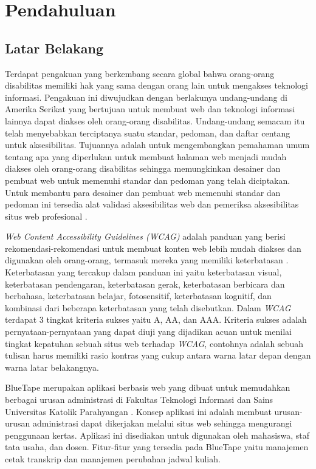 \chapter{Pendahuluan}
\label{chap:pendahuluan}
   
\section{Latar Belakang}
\label{sec:latarbelakang}
Terdapat pengakuan yang berkembang secara global bahwa orang-orang disabilitas memiliki hak yang sama dengan orang lain untuk mengakses teknologi informasi. Pengakuan ini diwujudkan dengan berlakunya undang-undang di Amerika Serikat yang bertujuan untuk membuat web dan teknologi informasi lainnya dapat diakses oleh orang-orang disabilitas. Undang-undang semacam itu telah menyebabkan terciptanya suatu standar, pedoman, dan daftar centang untuk aksesibilitas. Tujuannya adalah untuk mengembangkan pemahaman umum tentang apa yang diperlukan untuk membuat halaman web menjadi mudah diakses oleh orang-orang disabilitas sehingga memungkinkan desainer dan pembuat web untuk memenuhi standar dan pedoman yang telah diciptakan. Untuk membantu para desainer dan pembuat web memenuhi standar dan pedoman ini tersedia alat validasi aksesibilitas web dan pemeriksa aksesibilitas situs web profesional \cite{WebAccessibility-ABroderView}.

\textit{Web Content Accessibility Guidelines (WCAG)} adalah panduan yang berisi rekomendasi-rekomendasi untuk membuat konten web lebih mudah diakses dan digunakan oleh orang-orang, termasuk mereka yang memiliki keterbatasan \cite{WCAG:2.1}. Keterbatasan yang tercakup dalam panduan ini yaitu keterbatasan visual, keterbatasan pendengaran, keterbatasan gerak, keterbatasan berbicara dan berbahasa, keterbatasan belajar, fotosensitif, keterbatasan kognitif, dan kombinasi dari beberapa keterbatasan yang telah disebutkan. Dalam \textit{WCAG} terdapat 3 tingkat kriteria sukses yaitu A, AA, dan AAA. Kriteria sukses adalah pernyataan-pernyataan yang dapat diuji yang dijadikan acuan untuk menilai tingkat kepatuhan sebuah situs web terhadap \textit{WCAG}, contohnya adalah sebuah tulisan harus memiliki rasio kontras yang cukup antara warna latar depan dengan warna latar belakangnya.

BlueTape merupakan aplikasi berbasis web yang dibuat untuk memudahkan berbagai urusan administrasi di Fakultas Teknologi Informasi dan Sains Universitas Katolik Parahyangan \cite{BlueTape}. Konsep aplikasi ini adalah membuat urusan-urusan administrasi dapat dikerjakan melalui situs web sehingga mengurangi penggunaan kertas. Aplikasi ini disediakan untuk digunakan oleh mahasiswa, staf tata usaha, dan dosen. Fitur-fitur yang tersedia pada BlueTape yaitu manajemen cetak transkrip dan manajemen perubahan jadwal kuliah.


